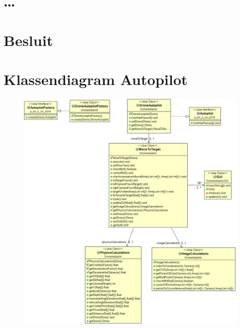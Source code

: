 \documentclass[tt]{penoverslag}
\begin{document}
\section{\ldots}


\section{Besluit}
\label{sec:Besluit}






\newpage\makeappendix

\section{Klassendiagram Autopilot} \label{App:KlassendiagramAutopilot}

\begin{figure}[h]
	\begin{center}
		\includegraphics[width=\textwidth]{KlassendiagramAutopilot.png}
	\end{center}
\end{figure}
\end{document}
